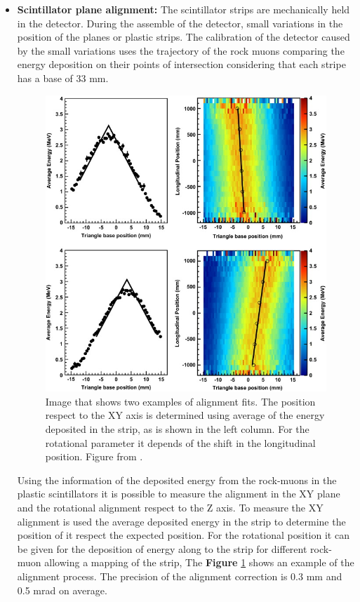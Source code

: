 \begin{itemize}
    
    \item \textbf{Scintillator plane alignment:} The scintillator strips are mechanically held in the detector. During the assemble of the detector, small variations in the position of the planes or plastic strips. The calibration of the detector caused by the small variations uses the trajectory of the rock muons comparing the energy deposition on their points of intersection considering that each stripe has a base of 33 mm. 
    \begin{figure}[!htb]
        \centering
        \includegraphics[scale=0.6]{Figures/Chapter2/AlignmentProfile.jpg}
        \caption{Image that shows two examples of alignment fits. The position respect to the XY axis is determined using average of the energy deposited in the strip, as is shown in  the left column. For the rotational parameter it depends of the shift in the longitudinal position. Figure from \cite{MINERvA}.}
        \label{fig:MnvExp:MnvDetector:Calibration:InSitu:Alignment}
    \end{figure}
    Using the information of the deposited energy from the rock-muons in the plastic scintillators it is possible to measure the alignment in the XY plane and the rotational alignment respect to the Z axis. To measure the XY alignment is used the average deposited energy in the strip to determine the position of it respect the expected position. For the rotational position it can be given for the deposition of energy along to the strip for different rock-muon allowing a mapping of the strip, The \textbf{Figure} \ref{fig:MnvExp:MnvDetector:Calibration:InSitu:Alignment} shows an example of the alignment process. The precision of the alignment correction is 0.3 mm and 0.5 mrad on average.
    



\end{itemize}
